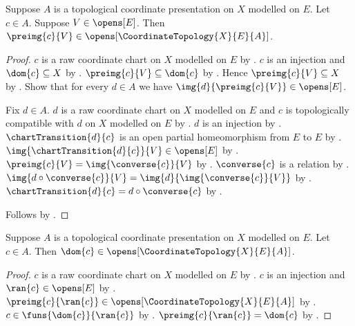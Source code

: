 \begin{theorem}\label{coordinate_chart_preimage_open}
    Suppose $A$ is a topological coordinate presentation on $X$ modelled on $E$.
    Let $c\in A$.
    Suppose $V\in\opens[E]$.
    Then $\preimg{c}{V}\in\opens[\CoordinateTopology{X}{E}{A}]$.
\end{theorem}
\begin{proof}
    $c$ is a raw coordinate chart on $X$ modelled on $E$ by
        .
    $c$ is an injection and $\dom{c}\subseteq X$ by .
    $\preimg{c}{V}\subseteq\dom{c}$ by .
    Hence $\preimg{c}{V}\subseteq X$ by .
    Show that for every $d\in A$ we have $\img{d}{\preimg{c}{V}}\in\opens[E]$.
    \begin{subproof}
        Fix $d\in A$.
        $d$ is a raw coordinate chart on $X$ modelled on $E$ and
            $c$ is topologically compatible with $d$ on $X$ modelled on $E$ by
            .
        $d$ is an injection by .
        $\chartTransition{d}{c}$ is an open partial homeomorphism from $E$ to $E$
            by .
        $\img{\chartTransition{d}{c}}{V}\in\opens[E]$ by
            .
        $\preimg{c}{V}=\img{\converse{c}}{V}$ by
            .
        $\converse{c}$ is a relation by .
        $\img{d\circ\converse{c}}{V}=\img{d}{\img{\converse{c}}{V}}$ by
            .
        $\chartTransition{d}{c}=d\circ\converse{c}$ by .
    \end{subproof}
    Follows by .
\end{proof}

\begin{theorem}\label{coordinate_chart_domain_open}
    Suppose $A$ is a topological coordinate presentation on $X$ modelled on $E$.
    Let $c\in A$.
    Then $\dom{c}\in\opens[\CoordinateTopology{X}{E}{A}]$.
\end{theorem}
\begin{proof}
    $c$ is a raw coordinate chart on $X$ modelled on $E$ by
        .
    $c$ is an injection and $\ran{c}\in\opens[E]$ by .
    $\preimg{c}{\ran{c}}\in\opens[\CoordinateTopology{X}{E}{A}]$ by
        .
    $c\in\funs{\dom{c}}{\ran{c}}$ by .
    $\preimg{c}{\ran{c}}=\dom{c}$ by .
\end{proof}


